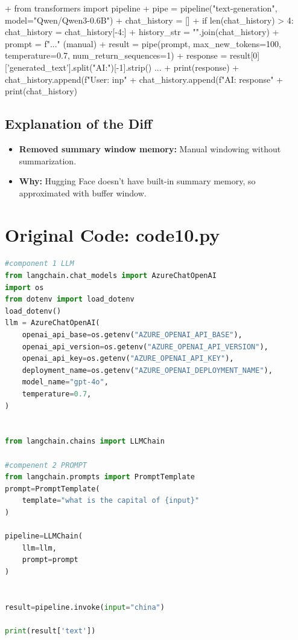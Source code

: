 \documentclass[11pt, a4paper]{article}
\begin{document}
\begin{addedcode}
\begin{diffverb}
+ from transformers import pipeline
+ pipe = pipeline("text-generation", model="Qwen/Qwen3-0.6B")
+ chat_history = []
+ if len(chat_history) > 4: chat_history = chat_history[-4:]
+ history_str = "\n".join(chat_history)
+ prompt = f"..." (manual)
+ result = pipe(prompt, max_new_tokens=100, temperature=0.7, num_return_sequences=1)
+ response = result[0]['generated_text'].split("AI:")[-1].strip() ...
+ print(response)
+ chat_history.append(f"User: {inp}"
+ chat_history.append(f"AI: {response}"
+ print(chat_history)
\end{diffverb}
\end{addedcode}


\subsection{Explanation of the Diff}
\begin{itemize}
    \item \textbf{Removed summary window memory:} Manual windowing without summarization.
    \item \textbf{Why:} Hugging Face doesn't have built-in summary memory, so approximated with buffer window.
\end{itemize}


\newpage
\section{Original Code: code10.py}
\begin{lstlisting}[language=Python]
#component 1 LLM
from langchain.chat_models import AzureChatOpenAI
import os
from dotenv import load_dotenv
load_dotenv()
llm = AzureChatOpenAI(
    openai_api_base=os.getenv("AZURE_OPENAI_API_BASE"),
    openai_api_version=os.getenv("AZURE_OPENAI_API_VERSION"),
    openai_api_key=os.getenv("AZURE_OPENAI_API_KEY"),
    deployment_name=os.getenv("AZURE_OPENAI_DEPLOYMENT_NAME"),
    model_name="gpt-4o",
    temperature=0.7,
)


from langchain.chains import LLMChain

#compenent 2 PROMPT
from langchain.prompts import PromptTemplate
prompt=PromptTemplate(
    template="what is the capital of {input}"
)

pipeline=LLMChain(
    llm=llm,
    prompt=prompt
)


result=pipeline.invoke(input="china")

print(result['text'])
\end{lstlisting}
\end{document}
